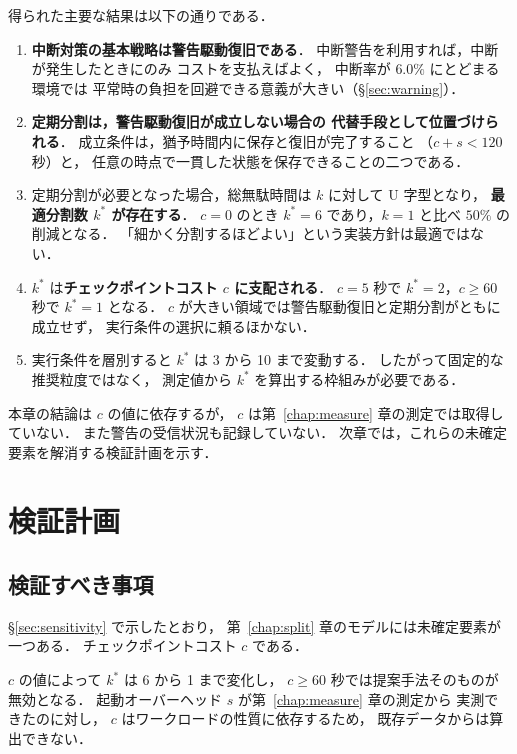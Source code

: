 \documentclass[11pt,a4paper]{ltjsreport}
\begin{document}
得られた主要な結果は以下の通りである．

\begin{enumerate}
  \item \textbf{中断対策の基本戦略は警告駆動復旧である}．
        中断警告を利用すれば，中断が発生したときにのみ
        コストを支払えばよく，
        中断率が $6.0\%$ にとどまる環境では
        平常時の負担を回避できる意義が大きい（\S\ref{sec:warning}）．
  \item \textbf{定期分割は，警告駆動復旧が成立しない場合の
        代替手段として位置づけられる}．
        成立条件は，猶予時間内に保存と復旧が完了すること
        （$c + s < 120$ 秒）と，
        任意の時点で一貫した状態を保存できることの二つである．
  \item 定期分割が必要となった場合，総無駄時間は $k$ に対して U 字型となり，
        \textbf{最適分割数 $k^{*}$ が存在する}．
        $c=0$ のとき $k^{*}=6$ であり，$k=1$ と比べ $50\%$ の削減となる．
        「細かく分割するほどよい」という実装方針は最適ではない．
  \item $k^{*}$ は\textbf{チェックポイントコスト $c$ に支配される}．
        $c=5$ 秒で $k^{*}=2$，$c \geq 60$ 秒で $k^{*}=1$ となる．
        $c$ が大きい領域では警告駆動復旧と定期分割がともに成立せず，
        実行条件の選択に頼るほかない．
  \item 実行条件を層別すると $k^{*}$ は 3 から 10 まで変動する．
        したがって固定的な推奨粒度ではなく，
        測定値から $k^{*}$ を算出する枠組みが必要である．
\end{enumerate}

本章の結論は $c$ の値に依存するが，
$c$ は第~\ref{chap:measure} 章の測定では取得していない．
また警告の受信状況も記録していない．
次章では，これらの未確定要素を解消する検証計画を示す．

\chapter{検証計画}
\label{chap:plan}

\section{検証すべき事項}

\S\ref{sec:sensitivity} で示したとおり，
第~\ref{chap:split} 章のモデルには未確定要素が一つある．
チェックポイントコスト $c$ である．

$c$ の値によって $k^{*}$ は 6 から 1 まで変化し，
$c \geq 60$ 秒では提案手法そのものが無効となる．
起動オーバーヘッド $s$ が第~\ref{chap:measure} 章の測定から
実測できたのに対し，
$c$ はワークロードの性質に依存するため，
既存データからは算出できない．
\end{document}
